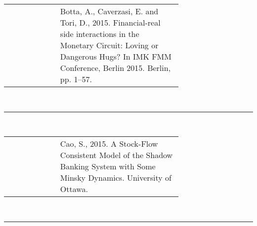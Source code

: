 \documentclass[twoside,a4paper,11pt]{article}
\begin{document}
\begin{tabular}{lp{0.7\linewidth}}
\cite{Botta2015} & Botta, A., Caverzasi, E. and Tori, D., 2015. Financial-real side interactions in the Monetary Circuit: Loving or Dangerous Hugs? In IMK FMM Conference, Berlin 2015. Berlin, pp. 1–57.
\end{tabular}\\[5pt]
\begin{center}
\rule{10cm}{1pt}   \\[5pt]
\end{center}

\begin{tabular}{lp{0.7\linewidth}}
\cite{Cao2015} & Cao, S., 2015. A Stock-Flow Consistent Model of the Shadow Banking System with Some Minsky Dynamics. University of Ottawa.
\end{tabular}\\[5pt]
\begin{center}
\rule{10cm}{1pt}   \\[5pt]
\end{center}


\nocite{*}



\end{document}
